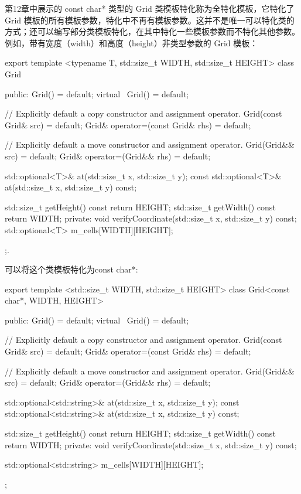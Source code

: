 第12章中展示的 const char* 类型的 Grid 类模板特化称为全特化模板，它特化了 Grid 模板的所有模板参数，特化中不再有模板参数。这并不是唯一可以特化类的方式；还可以编写部分类模板特化，在其中特化一些模板参数而不特化其他参数。例如，带有宽度（width）和高度（height）非类型参数的 Grid 模板：

\begin{cpp}
export template <typename T, std::size_t WIDTH, std::size_t HEIGHT>
class Grid
{
    public:
        Grid() = default;
        virtual ~Grid() = default;

        // Explicitly default a copy constructor and assignment operator.
        Grid(const Grid& src) = default;
        Grid& operator=(const Grid& rhs) = default;

        // Explicitly default a move constructor and assignment operator.
        Grid(Grid&& src) = default;
        Grid& operator=(Grid&& rhs) = default;

        std::optional<T>& at(std::size_t x, std::size_t y);
        const std::optional<T>& at(std::size_t x, std::size_t y) const;

        std::size_t getHeight() const { return HEIGHT; }
        std::size_t getWidth() const { return WIDTH; }
    private:
        void verifyCoordinate(std::size_t x, std::size_t y) const;
        std::optional<T> m_cells[WIDTH][HEIGHT];
};.
\end{cpp}

可以将这个类模板特化为const char*:

\begin{cpp}
export template <std::size_t WIDTH, std::size_t HEIGHT>
class Grid<const char*, WIDTH, HEIGHT>
{
    public:
        Grid() = default;
        virtual ~Grid() = default;

        // Explicitly default a copy constructor and assignment operator.
        Grid(const Grid& src) = default;
        Grid& operator=(const Grid& rhs) = default;

        // Explicitly default a move constructor and assignment operator.
        Grid(Grid&& src) = default;
        Grid& operator=(Grid&& rhs) = default;

        std::optional<std::string>& at(std::size_t x, std::size_t y);
        const std::optional<std::string>& at(std::size_t x, std::size_t y) const;

        std::size_t getHeight() const { return HEIGHT; }
        std::size_t getWidth() const { return WIDTH; }
    private:
        void verifyCoordinate(std::size_t x, std::size_t y) const;

        std::optional<std::string> m_cells[WIDTH][HEIGHT];
};
\end{cpp}


